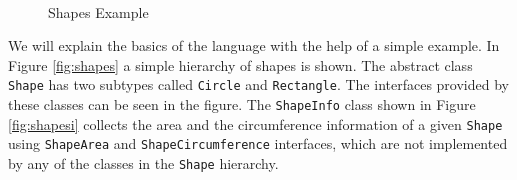 \documentclass{llncs}
\begin{document}
\begin{figure}
\centering

~~~

\label{fig:example1}
\caption{Shapes Example}
\end{figure}

We will explain the basics of the language with the help of a simple example. In Figure \ref{fig:shapes} a simple hierarchy of shapes is shown. The abstract class \texttt{Shape} has two subtypes called \texttt{Circle} and \texttt{Rectangle}. The interfaces provided by these classes can be seen in the figure. The \texttt{ShapeInfo} class shown in Figure \ref{fig:shapesi} collects the area and the circumference information of a given \texttt{Shape} using \texttt{ShapeArea} and \texttt{ShapeCircumference} interfaces, which are not implemented by any of the classes in the \texttt{Shape} hierarchy. 
\end{document}
